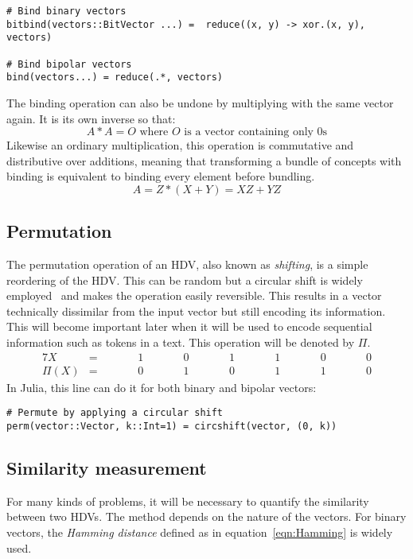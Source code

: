 \begin{verbatim}
# Bind binary vectors
bitbind(vectors::BitVector ...) =  reduce((x, y) -> xor.(x, y), vectors)

# Bind bipolar vectors
bind(vectors...) = reduce(.*, vectors)
\end{verbatim}

The binding operation can also be undone by multiplying with the same vector again. It is its own inverse so that:
\begin{equation}
    \label{eqn:multpinv}
    A * A = O \text{ where $O$ is a vector containing only 0s}
\end{equation}
Likewise an ordinary multiplication, this operation is commutative and distributive over additions, meaning that transforming a bundle of concepts with binding is equivalent to binding every element before bundling.
\begin{equation}
    \label{eqn:multpdis}
    A = Z*(X + Y) = XZ + YZ
\end{equation}
\subsection*{Permutation} \label{sssec:perm}
The permutation operation of an HDV, also known as \textit{shifting}, is a simple reordering of the HDV. This can be random but a circular shift is widely employed~\cite{HD_rev} and makes the operation easily reversible. This results in a vector technically dissimilar from the input vector but still encoding its information. This will become important later when it will be used to encode sequential information such as tokens in a text. This operation will be denoted by $\Pi$.
\begin{alignat*}{7}
    X &= && \qquad 1 && \qquad 0 && \qquad 1 && \qquad 1 && \qquad 0 && \qquad 0 \\
    \hline
    \Pi(X) &= && \qquad 0 && \qquad 1 && \qquad 0 &&  \qquad 1 && \qquad 1 && \qquad 0
\end{alignat*}
In Julia, this line can do it for both binary and bipolar vectors:

\begin{verbatim}
# Permute by applying a circular shift
perm(vector::Vector, k::Int=1) = circshift(vector, (0, k))
\end{verbatim}

\subsection*{Similarity measurement} \label{sssec:sim}
For many kinds of problems, it will be necessary to quantify the similarity between two HDVs. The method depends on the nature of the vectors. For binary vectors, the \textit{Hamming distance} defined as in equation~\ref{eqn:Hamming} is widely used.

